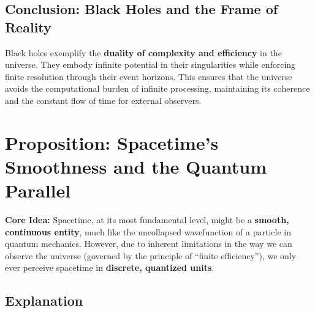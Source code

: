 \documentclass[12pt]{article}
\begin{document}
\subsection{Conclusion: Black Holes and the Frame of Reality}

Black holes exemplify the \textbf{duality of complexity and efficiency} in the universe. They embody infinite potential in their singularities while enforcing finite resolution through their event horizons. This ensures that the universe avoids the computational burden of infinite processing, maintaining its coherence and the constant flow of time for external observers.


\section{Proposition: Spacetime's Smoothness and the Quantum Parallel}

\textbf{Core Idea:} Spacetime, at its most fundamental level, might be a \textbf{smooth, continuous entity}, much like the uncollapsed wavefunction of a particle in quantum mechanics. However, due to inherent limitations in the way we can observe the universe (governed by the principle of ``finite efficiency''), we only ever perceive spacetime in \textbf{discrete, quantized units}.

\subsection{Explanation}
\end{document}
